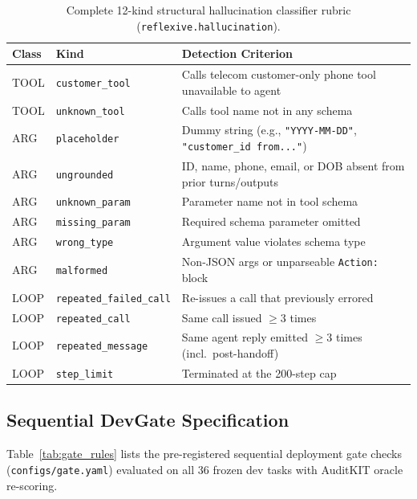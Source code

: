 \documentclass[11pt]{article}
\begin{document}
\begin{table}[h]
\centering
\footnotesize
\setlength{\tabcolsep}{2.5pt}
\begin{tabular}{llp{3.1cm}}
\toprule
\textbf{Class} & \textbf{Kind} & \textbf{Detection Criterion} \\
\midrule
TOOL & \texttt{customer\_tool} & Calls telecom customer-only phone tool unavailable to agent \\
TOOL & \texttt{unknown\_tool} & Calls tool name not in any schema \\
\midrule
ARG & \texttt{placeholder} & Dummy string (e.g., \texttt{"YYYY-MM-DD"}, \texttt{"customer\_id from..."}) \\
ARG & \texttt{ungrounded} & ID, name, phone, email, or DOB absent from prior turns/outputs \\
ARG & \texttt{unknown\_param} & Parameter name not in tool schema \\
ARG & \texttt{missing\_param} & Required schema parameter omitted \\
ARG & \texttt{wrong\_type} & Argument value violates schema type \\
ARG & \texttt{malformed} & Non-JSON args or unparseable \texttt{Action:} block \\
\midrule
LOOP & \texttt{repeated\_failed\_call} & Re-issues a call that previously errored \\
LOOP & \texttt{repeated\_call} & Same call issued $\ge 3$ times \\
LOOP & \texttt{repeated\_message} & Same agent reply emitted $\ge 3$ times (incl.\ post-handoff) \\
LOOP & \texttt{step\_limit} & Terminated at the 200-step cap \\
\bottomrule
\end{tabular}
\caption{Complete 12-kind structural hallucination classifier rubric (\texttt{reflexive.hallucination}).}
\label{tab:rubric}
\end{table}

\subsection{Sequential DevGate Specification}
Table~\ref{tab:gate_rules} lists the pre-registered sequential deployment gate checks (\texttt{configs/gate.yaml}) evaluated on all 36 frozen dev tasks with AuditKIT oracle re-scoring.
\end{document}
